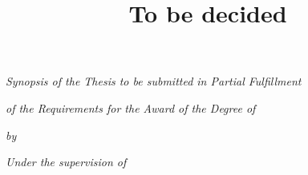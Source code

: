 \title{\fontsize{18}{18} \textbf{{To be decided}}}

\date{{}}

\vspace{-3.0cm}

\maketitle
\thispagestyle{empty}


{\centering \fontsize{13}{13} \em Synopsis of the Thesis to be
submitted in Partial Fulfillment \par}

{\centering \fontsize{13}{13} \em of the Requirements for the
Award of the Degree of\par}


\vspace{1.0cm}

{\par}

\vspace{0.8cm}

{\centering \fontsize{13}{13} \em by\par}

\vspace{0.5cm}

{\par}

\vspace{0.25cm}

{\par}

\vspace{1.0cm}

{\centering \fontsize{13}{13} \em Under the supervision of\par}

\vspace{0.6cm}

{\par}

\vspace{1cm}

